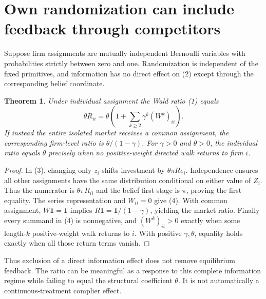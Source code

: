 \documentclass[11pt]{article}
\newtheorem{theorem}{Theorem}
\theoremstyle{definition}
\begin{document}
\section*{Own randomization can include feedback through competitors}
Suppose firm assignments are mutually independent Bernoulli variables
with probabilities strictly between zero and one. Randomization is
independent of the fixed primitives, and information has no direct effect
on (2) except through the corresponding belief coordinate.

\begin{theorem}
Under individual assignment the Wald ratio (1) equals
\[
 \theta R_{ii}
 =\theta\left(1+\sum_{k\ge2}\gamma^k(W^k)_{ii}\right).   \tag{4}
\]
If instead the entire isolated market receives a common assignment,
the corresponding firm-level ratio is $\theta/(1-\gamma)$.
For $\gamma>0$ and $\theta>0$, the individual ratio equals $\theta$
precisely when no positive-weight directed walk returns to firm $i$.
\end{theorem}
\begin{proof}
In (3), changing only $z_i$ shifts investment by
$\theta\pi Re_i$. Independence ensures all other assignments have
the same distribution conditional on either value of $Z_i$. Thus
the numerator is $\theta\pi R_{ii}$ and the belief first stage is
$\pi$, proving the first equality. The series representation and
$W_{ii}=0$ give (4). With common assignment, $W\mathbf1=\mathbf1$
implies $R\mathbf1=\mathbf1/(1-\gamma)$, yielding the market ratio.
Finally every summand in (4) is nonnegative, and
$(W^k)_{ii}>0$ exactly when some length-$k$ positive-weight walk
returns to $i$. With positive $\gamma,\theta$, equality holds exactly
when all those return terms vanish.
\end{proof}
Thus exclusion of a direct information effect does not remove equilibrium
feedback. The ratio can be meaningful as a response to this complete
information regime while failing to equal the structural coefficient
$\theta$. It is not automatically a continuous-treatment complier effect.
\end{document}
